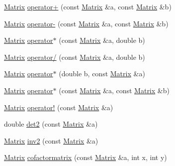 \begin{DoxyCompactItemize}
\item 
\hyperlink{classchittmatrix_1_1Matrix}{\-Matrix} \hyperlink{namespacechittmatrix_ad5fa05f2178a5d5940bc7bc6315cd2c6}{operator+} (const \hyperlink{classchittmatrix_1_1Matrix}{\-Matrix} \&a, const \hyperlink{classchittmatrix_1_1Matrix}{\-Matrix} \&b)
\item 
\hyperlink{classchittmatrix_1_1Matrix}{\-Matrix} \hyperlink{namespacechittmatrix_ade504a94600d9908f40f518f372e881a}{operator-\/} (const \hyperlink{classchittmatrix_1_1Matrix}{\-Matrix} \&a, const \hyperlink{classchittmatrix_1_1Matrix}{\-Matrix} \&b)
\item 
\hyperlink{classchittmatrix_1_1Matrix}{\-Matrix} \hyperlink{namespacechittmatrix_a9563616943e8689474a5877262899610}{operator$\ast$} (const \hyperlink{classchittmatrix_1_1Matrix}{\-Matrix} \&a, double b)
\item 
\hyperlink{classchittmatrix_1_1Matrix}{\-Matrix} \hyperlink{namespacechittmatrix_a63f226c14bbb523b920dd8410e70dda3}{operator/} (const \hyperlink{classchittmatrix_1_1Matrix}{\-Matrix} \&a, double b)
\item 
\hyperlink{classchittmatrix_1_1Matrix}{\-Matrix} \hyperlink{namespacechittmatrix_a98be40d5e888402f14c8c7480fd91484}{operator$\ast$} (double b, const \hyperlink{classchittmatrix_1_1Matrix}{\-Matrix} \&a)
\item 
\hyperlink{classchittmatrix_1_1Matrix}{\-Matrix} \hyperlink{namespacechittmatrix_a855f3fed9bad8dc5a5df07eaba5b8538}{operator$\ast$} (const \hyperlink{classchittmatrix_1_1Matrix}{\-Matrix} \&a, const \hyperlink{classchittmatrix_1_1Matrix}{\-Matrix} \&b)
\item 
\hyperlink{classchittmatrix_1_1Matrix}{\-Matrix} \hyperlink{namespacechittmatrix_a0862f12cf8d37ce2f8699785c5ab4158}{operator!} (const \hyperlink{classchittmatrix_1_1Matrix}{\-Matrix} \&a)
\item 
double \hyperlink{namespacechittmatrix_a098703b0c8025e833a181a60af997875}{det2} (const \hyperlink{classchittmatrix_1_1Matrix}{\-Matrix} \&a)
\item 
\hyperlink{classchittmatrix_1_1Matrix}{\-Matrix} \hyperlink{namespacechittmatrix_ae9095deb321f19e59deb1216a945e8c6}{inv2} (const \hyperlink{classchittmatrix_1_1Matrix}{\-Matrix} \&a)
\item 
\hyperlink{classchittmatrix_1_1Matrix}{\-Matrix} \hyperlink{namespacechittmatrix_a15e3ed5121a122b96f371139f5323a3d}{cofactormatrix} (const \hyperlink{classchittmatrix_1_1Matrix}{\-Matrix} \&a, int x, int y)

\end{DoxyCompactItemize}
